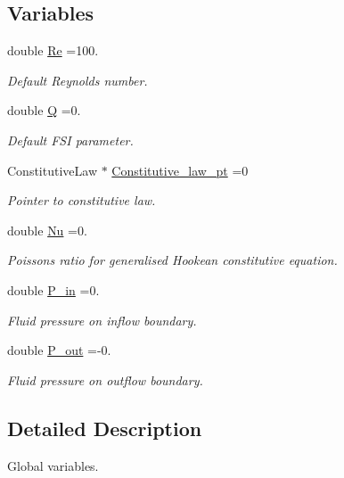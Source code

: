 \subsection*{Variables}
\begin{DoxyCompactItemize}
\item 
double \hyperlink{namespaceGlobal__Parameters_a9d72e94a9305c6a310940a6a427ebe06}{Re} =100.
\begin{DoxyCompactList}\small\item\em Default Reynolds number. \end{DoxyCompactList}\item 
double \hyperlink{namespaceGlobal__Parameters_a7814fddf663e56168174a42d2cd6b4c1}{Q} =0.
\begin{DoxyCompactList}\small\item\em Default F\+SI parameter. \end{DoxyCompactList}\item 
Constitutive\+Law $\ast$ \hyperlink{namespaceGlobal__Parameters_adbd1f040f375c96fe56b3f475f7dbec2}{Constitutive\+\_\+law\+\_\+pt} =0
\begin{DoxyCompactList}\small\item\em Pointer to constitutive law. \end{DoxyCompactList}\item 
double \hyperlink{namespaceGlobal__Parameters_a20fccdcfa2c15ad8b951b9ada3bb1661}{Nu} =0.
\begin{DoxyCompactList}\small\item\em Poisson\textquotesingle{}s ratio for generalised Hookean constitutive equation. \end{DoxyCompactList}\item 
double \hyperlink{namespaceGlobal__Parameters_a05b26d00935600b5e0149872844f224c}{P\+\_\+in} =0.
\begin{DoxyCompactList}\small\item\em Fluid pressure on inflow boundary. \end{DoxyCompactList}\item 
double \hyperlink{namespaceGlobal__Parameters_ac680ed856897793d54c9c867da19169c}{P\+\_\+out} =-\/0.
\begin{DoxyCompactList}\small\item\em Fluid pressure on outflow boundary. \end{DoxyCompactList}\end{DoxyCompactItemize}


\subsection{Detailed Description}
Global variables. 

